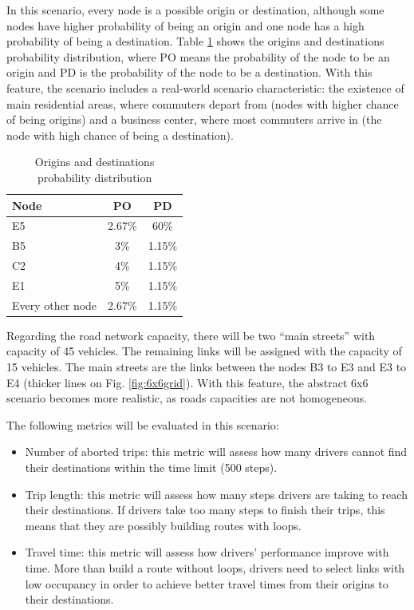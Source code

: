 \documentclass{RITA}
\begin{document}
In this scenario, every node is a possible origin or destination, although some nodes have higher probability of being an origin and one node has a high probability of being a destination. Table \ref{tab:odprob} shows the origins and destinations probability distribution, where PO means the probability of the node to be an origin and PD is the probability of the node to be a destination. With this feature, the scenario includes a real-world scenario characteristic: the existence of main residential areas, where commuters depart from (nodes with higher chance of being origins) and a business center, where most commuters arrive in (the node with high chance of being a destination).

{%
\begin{table}[ht]
\begin{center}
\begin{tabular}{|l|c|c|} \hline
Node & PO & PD \\ \hline
E5 & 2.67\% & 60\% \\ \hline
B5 & 3\% & 1.15\% \\ \hline
C2 & 4\% & 1.15\% \\ \hline
E1 & 5\% & 1.15\% \\ \hline
Every other node & 2.67\% & 1.15\% \\ \hline
\end{tabular}
\caption{Origins and destinations probability distribution}\label{tab:odprob}
\end{center}
\end{table}
}%
Regarding the road network capacity, there will be two ``main streets'' with capacity of 45 vehicles. The remaining links will be assigned with the capacity of 15 vehicles. The main streets are the links between the nodes B3 to E3 and E3 to E4 (thicker lines on Fig. \ref{fig:6x6grid}). With this feature, the abstract 6x6 scenario becomes more realistic, as roads capacities are not homogeneous.

The following metrics will be evaluated in this scenario:

\begin{itemize}
  \item Number of aborted trips: this metric will assess how many drivers cannot find their destinations within the time limit (500 steps).
  \item Trip length: this metric will assess how many steps drivers are taking to reach their destinations. If drivers take too many steps to finish their trips, this means that they are possibly building routes with loops.
 \item Travel time: this metric will assess how drivers' performance improve with time. More than build a route without loops, drivers need to select links with low occupancy in order to achieve better travel times from their origins to their destinations.
\end{itemize}
\end{document}
